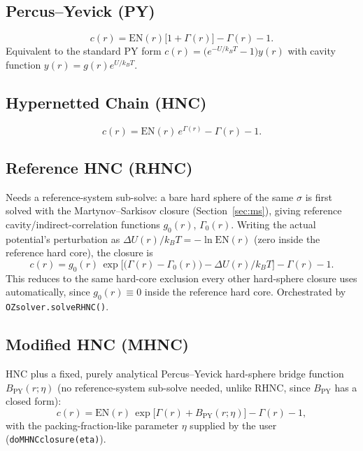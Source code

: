 \documentclass[11pt,a4paper]{article}
\newcommand{\code}[1]{\texttt{#1}}
\begin{document}
\subsection{Percus--Yevick (PY)}
\begin{equation}
  c(r) = \mathrm{EN}(r)\big[1+\Gamma(r)\big] - \Gamma(r) - 1.
\end{equation}
Equivalent to the standard PY form $c(r)=\big(e^{-U/k_BT}-1\big)y(r)$ with
cavity function $y(r)=g(r)e^{U/k_BT}$.

\subsection{Hypernetted Chain (HNC)}
\begin{equation}
  c(r) = \mathrm{EN}(r)\,e^{\Gamma(r)} - \Gamma(r) - 1.
\end{equation}

\subsection{Reference HNC (RHNC)}
\label{sec:rhnc}
Needs a reference-system sub-solve: a bare hard sphere of the same $\sigma$ is
first solved with the Martynov--Sarkisov closure (Section~\ref{sec:ms}),
giving reference cavity/indirect-correlation functions $g_0(r)$, $\Gamma_0(r)$.
Writing the actual potential's perturbation as
$\Delta U(r)/k_BT = -\ln\mathrm{EN}(r)$ (zero inside the reference hard core),
the closure is
\begin{equation}
  c(r) = g_0(r)\,\exp\!\big[\big(\Gamma(r)-\Gamma_0(r)\big) - \Delta U(r)/k_BT\big] - \Gamma(r) - 1.
\end{equation}
This reduces to the same hard-core exclusion every other hard-sphere closure
uses automatically, since $g_0(r)\equiv0$ inside the reference hard core.
Orchestrated by \code{OZsolver.solveRHNC()}.

\subsection{Modified HNC (MHNC)}
HNC plus a fixed, purely analytical Percus--Yevick hard-sphere bridge function
$B_{\mathrm{PY}}(r;\eta)$ (no reference-system sub-solve needed, unlike RHNC,
since $B_{\mathrm{PY}}$ has a closed form):
\begin{equation}
  c(r) = \mathrm{EN}(r)\,\exp\!\big[\Gamma(r) + B_{\mathrm{PY}}(r;\eta)\big] - \Gamma(r) - 1,
\end{equation}
with the packing-fraction-like parameter $\eta$ supplied by the user
(\code{doMHNCclosure(eta)}).
\end{document}
